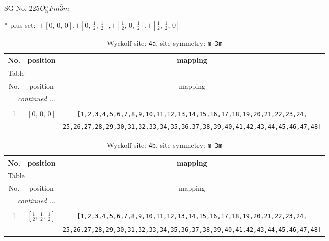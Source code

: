 \documentclass[fleqn,8pt]{jsarticle}
\begin{document}
\setcounter{MaxMatrixCols}{32}

\renewcommand{\tablename}{Table~}
\renewcommand{\figurename}{Figure~}
\begin{center}
\LARGE
SG No. 225\quad$O_{\rm h}^{5}$\quad$Fm\bar{3}m$\quad[ cubic ]
\end{center}
* plus set:\,\,\,$+\left[ 0,\, 0,\, 0 \right]$,\quad $+\left[ 0,\, \frac{1}{2},\, \frac{1}{2} \right]$,\quad $+\left[ \frac{1}{2},\, 0,\, \frac{1}{2} \right]$,\quad $+\left[ \frac{1}{2},\, \frac{1}{2},\, 0 \right]$
\renewcommand{\arraystretch}{1.2}
\begin{longtable}{ccc}
\caption{Wyckoff site: {\tt 4a}, site symmetry: {\tt m-3m}}
 \\
 \hline \hline
No. & position & mapping \\ \hline \endfirsthead

\multicolumn{2}{l}{\tablename\ \thetable{}} \\
 \hline \hline
No. & position & mapping \\ \hline \endhead

 \hline \hline
\multicolumn{2}{r}{\footnotesize\it continued ...} \\ \endfoot

 \hline \hline
\multicolumn{2}{r}{} \\ \endlastfoot

1 & $\left[ 0,\, 0,\, 0 \right]$ & {\tt [1,2,3,4,5,6,7,8,9,10,11,12,13,14,15,16,17,18,19,20,21,22,23,24,} \\ \hline
 &  & {\tt 25,26,27,28,29,30,31,32,33,34,35,36,37,38,39,40,41,42,43,44,45,46,47,48]} \\
\end{longtable}
\renewcommand{\arraystretch}{1.2}
\begin{longtable}{ccc}
\caption{Wyckoff site: {\tt 4b}, site symmetry: {\tt m-3m}}
 \\
 \hline \hline
No. & position & mapping \\ \hline \endfirsthead

\multicolumn{2}{l}{\tablename\ \thetable{}} \\
 \hline \hline
No. & position & mapping \\ \hline \endhead

 \hline \hline
\multicolumn{2}{r}{\footnotesize\it continued ...} \\ \endfoot

 \hline \hline
\multicolumn{2}{r}{} \\ \endlastfoot

1 & $\left[ \frac{1}{2},\, \frac{1}{2},\, \frac{1}{2} \right]$ & {\tt [1,2,3,4,5,6,7,8,9,10,11,12,13,14,15,16,17,18,19,20,21,22,23,24,} \\ \hline
 &  & {\tt 25,26,27,28,29,30,31,32,33,34,35,36,37,38,39,40,41,42,43,44,45,46,47,48]} \\
\end{longtable}
\end{document}

